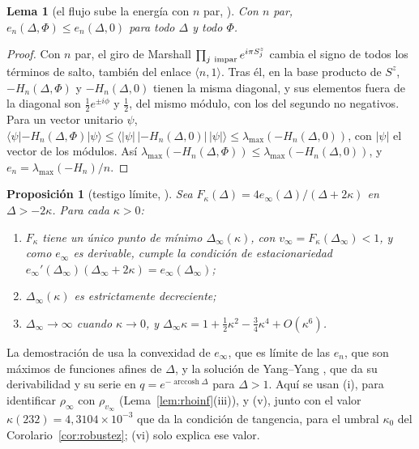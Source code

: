 \documentclass[11pt,a4paper]{article}
\newtheorem{lema}[teorema]{Lema}
\newtheorem{proposicion}[teorema]{Proposición}
\theoremstyle{remark}
\begin{document}
\begin{lema}[el flujo sube la energía con $n$ par, {\cite[Lema~23]{robustez}}]\label{lem:flujoA}
Con $n$ par, $e_n(\Delta,\Phi)\le e_n(\Delta,0)$ para todo $\Delta$ y todo $\Phi$.
\end{lema}

\begin{proof}
Con $n$ par, el giro de Marshall $\prod_{j\ \rm impar}e^{i\pi S^z_j}$ cambia el signo de todos los
términos de salto, también del enlace $\langle n,1\rangle$. Tras él, en la base producto de $S^z$, $-H_n(\Delta,\Phi)$
y $-H_n(\Delta,0)$ tienen la misma diagonal, y sus elementos fuera de la diagonal son
$\tfrac12e^{\pm i\phi}$ y $\tfrac12$, del mismo módulo, con los del segundo no negativos. Para un vector
unitario $\psi$, $\langle\psi|-H_n(\Delta,\Phi)|\psi\rangle\le\langle|\psi|\,|-H_n(\Delta,0)|\,|\psi|\rangle\le\lambda_{\max}(-H_n(\Delta,0))$, con
$|\psi|$ el vector de los módulos. Así
$\lambda_{\max}(-H_n(\Delta,\Phi))\le\lambda_{\max}(-H_n(\Delta,0))$, y $e_n=\lambda_{\max}(-H_n)/n$.
\end{proof}

\begin{proposicion}[testigo límite, {\cite[Prop.~17]{robustez}}]\label{prop:limiteA}
Sea $F_\kappa(\Delta)=4e_\infty(\Delta)/(\Delta+2\kappa)$ en $\Delta>-2\kappa$. Para cada $\kappa>0$:
\begin{enumerate}
\item[(i)] $F_\kappa$ tiene un único punto de mínimo $\Delta_\infty(\kappa)$, con $v_\infty=F_\kappa(\Delta_\infty)<1$, y
  como $e_\infty$ es derivable, cumple la condición de estacionariedad
  $e_\infty'(\Delta_\infty)(\Delta_\infty+2\kappa)=e_\infty(\Delta_\infty)$;
\item[(v)] $\Delta_\infty(\kappa)$ es estrictamente decreciente;
\item[(vi)] $\Delta_\infty\to\infty$ cuando $\kappa\to0$, y $\Delta_\infty\kappa=1+\tfrac12\kappa^2-\tfrac34\kappa^4+O(\kappa^6)$.
\end{enumerate}
\end{proposicion}

La demostración de \cite{robustez} usa la convexidad de $e_\infty$, que es límite de las $e_n$, que son
máximos de funciones afines de $\Delta$, y la solución de Yang--Yang \cite{yang-yang}, que da su
derivabilidad y su serie en $q=e^{-\operatorname{arccosh}\Delta}$ para $\Delta>1$. Aquí se usan (i), para
identificar $\rho_\infty$ con $\rho_{v_\infty}$ (Lema~\ref{lem:rhoinf}(iii)), y (v), junto con el valor
$\kappa(232)=4{,}3104\times10^{-3}$ que da la condición de tangencia, para el umbral $\kappa_0$ del
Corolario~\ref{cor:robustez}; (vi) solo explica ese valor.
\end{document}
